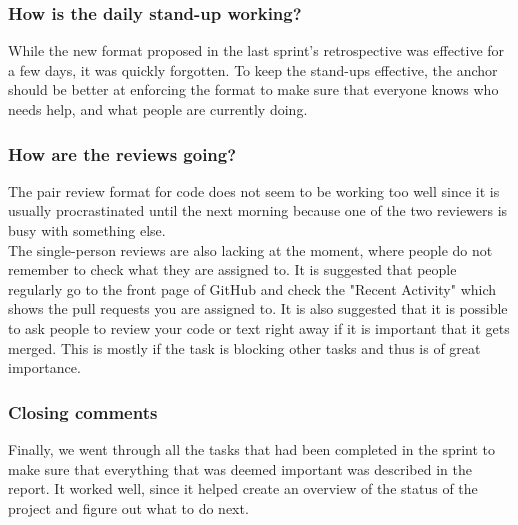 \subsubsection*{How is the daily stand-up working?}
While the new format proposed in the last sprint's retrospective was effective for a few days, it was quickly forgotten.
To keep the stand-ups effective, the anchor should be better at enforcing the format to make sure that everyone knows who needs help, and what people are currently doing.

\subsubsection*{How are the reviews going?}
The pair review format for code does not seem to be working too well since it is usually procrastinated until the next morning because one of the two reviewers is busy with something else.
\\
The single-person reviews are also lacking at the moment, where people do not remember to check what they are assigned to.
It is suggested that people regularly go to the front page of GitHub and check the "Recent Activity" which shows the pull requests you are assigned to.
It is also suggested that it is possible to ask people to review your code or text right away if it is important that it gets merged.
This is mostly if the task is blocking other tasks and thus is of great importance.


\subsubsection*{Closing comments}
Finally, we went through all the tasks that had been completed in the sprint to make sure that everything that was deemed important was described in the report.
It worked well, since it helped create an overview of the status of the project and figure out what to do next.
